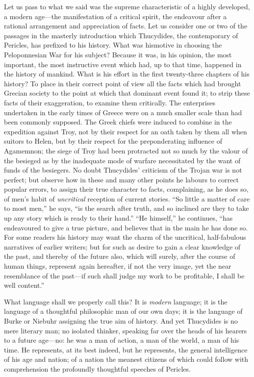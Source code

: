 Let us pass to what we said was the supreme characteristic of a highly
developed, a modern age---the manifestation of a critical spirit, the
endeavour after a rational arrangement and appreciation of facts. Let us
consider one or two of the passages in the masterly introduction which
Thucydides, the contemporary of Pericles, has prefixed to his history.
What was hismotive in choosing the Peloponnesian War for his subject?
Because it was, in his opinion, the most important, the most instructive
event which had, up to that time, happened in the history of mankind.
What is his effort in the first twenty-three chapters of his history? To
place in their correct point of view all the facts which had brought
Grecian society to the point at which that dominant event found it; to
strip these facts of their exaggeration, to examine them critically. The
enterprises undertaken in the early times of Greece were on a much
smaller scale than had been commonly supposed. The Greek chiefs were
induced to combine in the expedition against Troy, not by their respect
for an oath taken by them all when suitors to Helen, but by their
respect for the preponderating influence of Agamemnon; the siege of Troy
had been protracted not so much by the valour of the besieged as by the
inadequate mode of warfare necessitated by the want of funds of the
besiegers. No doubt Thucydides' criticism of the Trojan war is not
perfect; but observe how in these and many other points he labours to
correct popular errors, to assign their true character to facts,
complaining, as he does so, of men's habit of \emph{uncritical}
reception of current stories. ``So little a matter of care to most
men,'' he says, ``is the search after truth, and so inclined are they to
take up any story which is ready to their hand.'' ``He himself,'' he
continues, ``has endeavoured to give a true picture, and believes that
in the main he has done so. For some readers his history may want the
charm of the uncritical, half-fabulous narratives of earlier writers;
but for such as desire to gain a clear knowledge of the past, and
thereby of the future also, which will surely, after the course of human
things, represent again hereafter, if not the very image, yet the near
resemblance of the past---if such shall judge my work to be profitable,
I shall be well content.''

What language shall we properly call this? It is \emph{modern} language;
it is the language of a thoughtful philosophic man of our own days; it
is the language of Burke or Niebuhr assigning the true aim of history.
And yet Thucydides is no mere literary man; no isolated thinker,
speaking far over the heads of his hearers to a future age---no: he was
a man of action, a man of the world, a man of his time. He represents,
at its best indeed, but he represents, the general intelligence of his
age and nation; of a nation the meanest citizens of which could follow
with comprehension the profoundly thoughtful speeches of Pericles.

